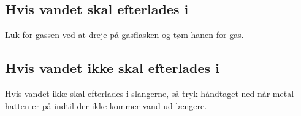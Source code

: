 \subsection{Hvis vandet skal efterlades i}
Luk for gassen ved at dreje på gasflasken og tøm hanen for gas.

\subsection{Hvis vandet ikke skal efterlades i}
Hvis vandet ikke skal efterlades i slangerne, så tryk håndtaget ned når metal-hatten er på indtil der ikke kommer vand ud længere.



